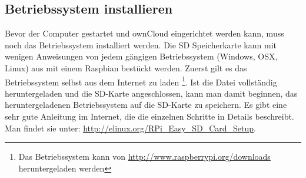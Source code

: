 \subsection{Betriebssystem installieren}
Bevor der Computer gestartet und ownCloud eingerichtet werden kann, muss noch das Betriebssystem installiert werden. 
Die SD Speicherkarte kann mit wenigen Anweisungen von jedem gängigen Betriebssystem (Windows, OSX, Linux) aus mit einem Raspbian bestückt werden.
Zuerst gilt es das Betriebssystem selbst aus dem Internet zu laden
\footnote{Das Betriebssystem kann von \url{http://www.raspberrypi.org/downloads} heruntergeladen werden}.
Ist die Datei vollständig heruntergeladen und die SD-Karte angeschlossen, kann man damit beginnen, das heruntergeladenen Betriebssystem auf die SD-Karte zu speichern.
Es gibt eine sehr gute Anleitung im Internet, die die einzelnen Schritte in Details beschreibt. Man findet sie unter: \url{http://elinux.org/RPi\_Easy\_SD\_Card\_Setup}.